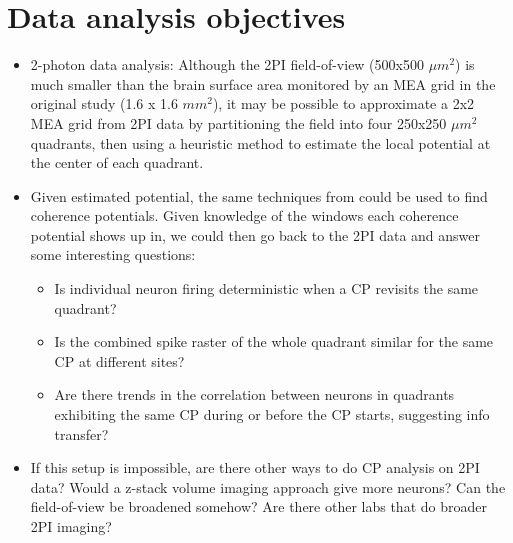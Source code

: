 \documentclass[a4paper, 12pt]{article}
\begin{document}
\section*{Data analysis objectives}
\begin{itemize}
\item 2-photon data analysis: Although the 2PI field-of-view (500x500 $\mu m^2$) is much smaller than the brain surface area monitored by an MEA grid in the original study \cite{cps2010} (1.6 x 1.6 $mm^2$), it may be possible to approximate a 2x2 MEA grid from 2PI data by partitioning the field into four 250x250 $\mu m^2$ quadrants, then using a heuristic method to estimate the local potential at the center of each quadrant.
\item Given estimated potential, the same techniques from \cite{cps2010} could be used to find coherence potentials. Given knowledge of the windows each coherence potential shows up in, we could then go back to the 2PI data and answer some interesting questions:
  \begin{itemize}
  \item Is individual neuron firing deterministic when a CP revisits the same quadrant?
  \item Is the combined spike raster of the whole quadrant similar for the same CP at different sites?
  \item Are there trends in the correlation between neurons in quadrants exhibiting the same CP during or before the CP starts, suggesting info transfer?
  \end{itemize}
\item If this setup is impossible, are there other ways to do CP analysis on 2PI data? Would a z-stack volume imaging approach give more neurons? Can the field-of-view be broadened somehow? Are there other labs that do broader 2PI imaging?
\end{itemize}

\end{document}
